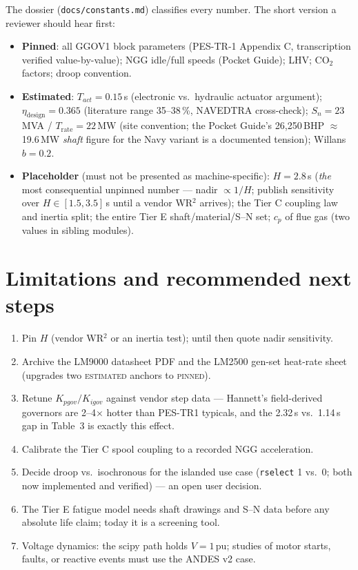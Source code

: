 \documentclass[11pt]{article}
\newcommand{\pu}{\,\text{pu}}
\begin{document}
The dossier (\texttt{docs/constants.md}) classifies every number. The
short version a reviewer should hear first:
\begin{itemize}[nosep]
\item \textbf{Pinned}: all GGOV1 block parameters (PES-TR-1 Appendix C,
  transcription verified value-by-value); NGG idle/full speeds (Pocket
  Guide); LHV; CO$_2$ factors; droop convention.
\item \textbf{Estimated}: $T_{act} = 0.15$\,s (electronic vs.\ hydraulic
  actuator argument); $\eta_\text{design} = 0.365$ (literature range
  35--38\,\%, NAVEDTRA cross-check); $S_n = 23$\,MVA / $T_\text{rate} =
  22$\,MW (site convention; the Pocket Guide's 26{,}250\,BHP
  $\approx$19.6\,MW \emph{shaft} figure for the Navy variant is a
  documented tension); Willans $b = 0.2$.
\item \textbf{Placeholder} (must not be presented as machine-specific):
  $H = 2.8$\,s (\emph{the} most consequential unpinned number --- nadir
  $\propto 1/H$; publish sensitivity over $H \in [1.5, 3.5]$\,s until a
  vendor WR$^2$ arrives); the Tier C coupling law and inertia split; the
  entire Tier E shaft/material/S--N set; $c_p$ of flue gas (two values in
  sibling modules).
\end{itemize}

\section{Limitations and recommended next steps}
\begin{enumerate}[nosep]
\item Pin $H$ (vendor WR$^2$ or an inertia test); until then quote nadir
  sensitivity.
\item Archive the LM9000 datasheet PDF and the LM2500 gen-set heat-rate
  sheet (upgrades two \textsc{estimated} anchors to \textsc{pinned}).
\item Retune $K_{pgov}/K_{igov}$ against vendor step data --- Hannett's
  field-derived governors are 2--4$\times$ hotter than PES-TR1 typicals,
  and the 2.32\,s vs.\ 1.14\,s gap in Table~3 is exactly this effect.
\item Calibrate the Tier C spool coupling to a recorded NGG acceleration.
\item Decide droop vs.\ isochronous for the islanded use case
  (\texttt{rselect} 1 vs.\ 0; both now implemented and verified) ---
  an open user decision.
\item The Tier E fatigue model needs shaft drawings and S--N data before
  any absolute life claim; today it is a screening tool.
\item Voltage dynamics: the scipy path holds $V = 1\pu$; studies of motor
  starts, faults, or reactive events must use the ANDES v2 case.
\end{enumerate}
\end{document}
